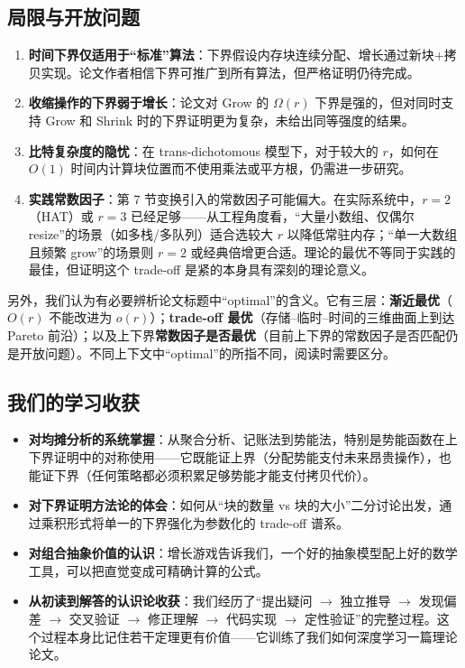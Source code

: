 \documentclass[12pt,a4paper]{ctexart}
\begin{document}
\subsection{局限与开放问题}

\begin{enumerate}[leftmargin=*]
    \item \textbf{时间下界仅适用于``标准''算法}：下界假设内存块连续分配、增长通过新块$+$拷贝实现。论文作者相信下界可推广到所有算法，但严格证明仍待完成。
    \item \textbf{收缩操作的下界弱于增长}：论文对 Grow 的 $\Omega(r)$ 下界是强的，但对同时支持 Grow 和 Shrink 时的下界证明更为复杂，未给出同等强度的结果。
    \item \textbf{比特复杂度的隐忧}：在 trans-dichotomous 模型下，对于较大的 $r$，如何在 $O(1)$ 时间内计算块位置而不使用乘法或平方根，仍需进一步研究。
    \item \textbf{实践常数因子}：第 7 节变换引入的常数因子可能偏大。在实际系统中，$r=2$（HAT）或 $r=3$ 已经足够——从工程角度看，``大量小数组、仅偶尔 resize''的场景（如多栈/多队列）适合选较大 $r$ 以降低常驻内存；``单一大数组且频繁 grow''的场景则 $r=2$ 或经典倍增更合适。理论的最优不等同于实践的最佳，但证明这个 trade-off 是紧的本身具有深刻的理论意义。
\end{enumerate}

另外，我们认为有必要辨析论文标题中``optimal''的含义。它有三层：\textbf{渐近最优}（$O(r)$ 不能改进为 $o(r)$）；\textbf{trade-off 最优}（存储--临时--时间的三维曲面上到达 Pareto 前沿）；以及上下界\textbf{常数因子是否最优}（目前上下界的常数因子是否匹配仍是开放问题）。不同上下文中``optimal''的所指不同，阅读时需要区分。

\subsection{我们的学习收获}

\begin{itemize}[leftmargin=*]
    \item \textbf{对均摊分析的系统掌握}：从聚合分析、记账法到势能法，特别是势能函数在上下界证明中的对称使用——它既能证上界（分配势能支付未来昂贵操作），也能证下界（任何策略都必须积累足够势能才能支付拷贝代价）。
    \item \textbf{对下界证明方法论的体会}：如何从``块的数量 vs 块的大小''二分讨论出发，通过乘积形式将单一的下界强化为参数化的 trade-off 谱系。
    \item \textbf{对组合抽象价值的认识}：增长游戏告诉我们，一个好的抽象模型配上好的数学工具，可以把直觉变成可精确计算的公式。
    \item \textbf{从初读到解答的认识论收获}：我们经历了``提出疑问 $\to$ 独立推导 $\to$ 发现偏差 $\to$ 交叉验证 $\to$ 修正理解 $\to$ 代码实现 $\to$ 定性验证''的完整过程。这个过程本身比记住若干定理更有价值——它训练了我们如何深度学习一篇理论论文。
\end{itemize}
\end{document}
